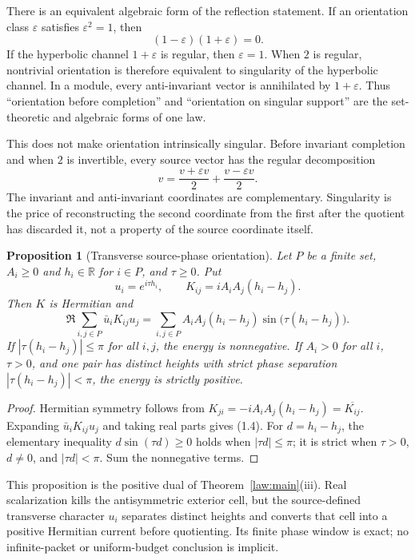 \documentclass[11pt]{article}
\newtheorem{proposition}[theorem]{Proposition}
\theoremstyle{definition}
\theoremstyle{remark}
\newcommand{\R}{\mathbb R}
\begin{document}
There is an equivalent algebraic form of the reflection statement.  If an orientation class
$\varepsilon$ satisfies $\varepsilon^2=1$, then
\[
 (1-\varepsilon)(1+\varepsilon)=0.
\tag{1.2}
\]
If the hyperbolic channel $1+\varepsilon$ is regular, then
$\varepsilon=1$.  When $2$ is regular, nontrivial orientation is therefore equivalent to
singularity of the hyperbolic channel.  In a module, every anti-invariant vector is annihilated by
$1+\varepsilon$.  Thus ``orientation before completion'' and ``orientation on singular support''
are the set-theoretic and algebraic forms of one law.

This does not make orientation intrinsically singular.  Before invariant completion and when
$2$ is invertible, every source vector has the regular decomposition
\[
 v=\frac{v+\varepsilon v}{2}+\frac{v-\varepsilon v}{2}.
\tag{1.3}
\]
The invariant and anti-invariant coordinates are complementary.  Singularity is the price of
reconstructing the second coordinate from the first after the quotient has discarded it, not a
property of the source coordinate itself.

\begin{proposition}[Transverse source-phase orientation]\label{prop:source-phase}
Let $P$ be a finite set, $A_i\geq0$ and $h_i\in\R$ for $i\in P$, and $\tau\geq0$.  Put
\[
 u_i=e^{i\tau h_i},\qquad K_{ij}=iA_iA_j(h_i-h_j).
\]
Then $K$ is Hermitian and
\[
 \Re\sum_{i,j\in P}\bar u_iK_{ij}u_j
 =\sum_{i,j\in P}A_iA_j(h_i-h_j)
   \sin\!\bigl(\tau(h_i-h_j)\bigr).
 \tag{1.4}
\]
If $|\tau(h_i-h_j)|\leq\pi$ for all $i,j$, the energy is nonnegative.  If
$A_i>0$ for all $i$, $\tau>0$, and one pair has distinct heights with strict phase separation
$|\tau(h_i-h_j)|<\pi$, the energy is strictly positive.
\end{proposition}

\begin{proof}
Hermitian symmetry follows from
$K_{ji}=-iA_iA_j(h_i-h_j)=\overline{K_{ij}}$.  Expanding
$\bar u_iK_{ij}u_j$ and taking real parts gives (1.4).  For
$d=h_i-h_j$, the elementary inequality
$d\sin(\tau d)\geq0$ holds when $|\tau d|\leq\pi$; it is strict when
$\tau>0$, $d\ne0$, and $|\tau d|<\pi$.  Sum the nonnegative terms.
\end{proof}

This proposition is the positive dual of Theorem~\ref{law:main}(iii).  Real scalarization kills
the antisymmetric exterior cell, but the source-defined transverse character $u_i$ separates
distinct heights and converts that cell into a positive Hermitian current before quotienting.
Its finite phase window is exact; no infinite-packet or uniform-budget conclusion is implicit.
\end{document}
